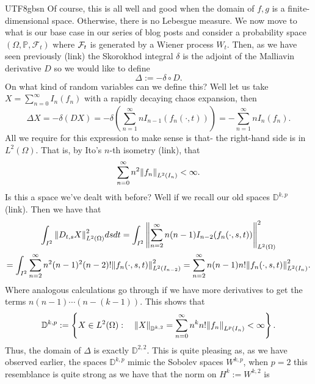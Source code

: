 \documentclass[12pt]{article}
\begin{document}
\begin{CJK*}{UTF8}{gbsn}
	Of course, this is all well and good when the domain of $f,g$ is a finite-dimensional space. Otherwise, there is no Lebesgue measure.	We now move to what is our base case in our series of blog posts and consider a probability space $(\Omega,\mathbb{P},\mathcal{F}_t)$ where $\mathcal{F}_t$ is generated by a Wiener process $W_t$. Then, as we have seen previously (link)
	the Skorokhod integral $\delta $ is the adjoint of the Malliavin derivative $D$ so we would like to define
	\begin{equation*}
		\Delta  := -\delta \circ D.
	\end{equation*}
	On what kind of random variables can we define this? Well let us take $X=\sum_{n=0}^{\infty}  I_n(f_n)$ with a rapidly decaying chaos expansion, then
	\begin{equation*}
		\Delta X=-\delta (DX)=-\delta \left(\sum_{n=1}^\infty nI_{n-1}(f_n(\cdot ,t))\right)=-\sum_{n=1}^\infty nI_{n}(f_n).
	\end{equation*}
	All we require for this expression to make sense is that- the right-hand side is in $L^2(\Omega)$. That is, by Ito's $n$-th isometry (link), that
	\begin{equation*}
		\sum_{n=0}^\infty n^2 \norm{f_n}_{L^2(I_n)}< \infty.
	\end{equation*}
	Is this a space we've dealt with before? Well if we recall our old spaces $\mathbb{D}^{k,p}$  (link). Then we have that
	\begin{multline*}
		\int_{I^2}\norm{D_{t,s}X}_{L^2(\Omega)}^2 ds d t=\int_{I^2}\norm{\sum_{n=2}^\infty n(n-1)I_{n-2}(f_n(\cdot ,s,t))}_{L^2(\Omega)}^2\\=\int_{I^2}\sum_{n=2}^\infty n^2(n-1)^2(n-2)!\norm{f_n(\cdot ,s,t)}_{L^2(I_{n-2})}^2=\sum_{n=2}^\infty n(n-1)n!\norm{f_n(\cdot ,s,t)}_{L^2(I_n)}^2.
	\end{multline*}
	Where analogous calculations go through if we have more derivatives to get the terms $n(n-1)\cdots (n-(k-1))$. This shows that
	\begin{equation*}
		\mathbb{D}^{k,p}:=\left\{X\in L^2(\Omega):\quad \norm{X}_{\mathbb{D}^{k,2}}=\sum_{n=0}^\infty n^kn! \norm{f_n}_{L^p(I_n)}< \infty\right\} .
	\end{equation*}
	Thus, the domain of $\Delta $ is exactly  $\mathbb{D}^{2,2}$. This is quite pleasing as, as we have observed earlier, the spaces $\mathbb{D}^{k,p}$ mimic the Sobolev spaces $W^{k,p}$, when $p=2$ this resemblance is quite strong
	as we have that the norm on  $H^k:=W^{k,2}$ is
	\begin{equation*}

\end{equation*}
\end{CJK*}
\end{document}
